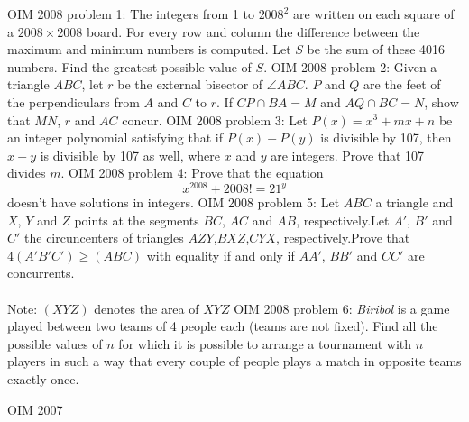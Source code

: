 OIM 2008 problem 1:  The integers from 1 to $ 2008^2$ are written on each square of a $ 2008 \times 2008$ board. For every row and column the difference between the maximum and minimum numbers is computed. Let $ S$ be the sum of these 4016 numbers. Find the greatest possible value of $ S$. 
OIM 2008 problem 2:  Given a triangle $ ABC$, let $ r$ be the external bisector of $ \angle ABC$. $ P$ and $ Q$ are the feet of the perpendiculars from $ A$ and $ C$ to $ r$. If $ CP \cap BA = M$ and $ AQ \cap BC=N$, show that $ MN$, $ r$ and $ AC$ concur. 
OIM 2008 problem 3:  Let $ P(x) = x^3 + mx + n$ be an integer polynomial satisfying that if $ P(x) - P(y)$ is divisible by 107, then $ x - y$ is divisible by 107 as well, where $ x$ and $ y$ are integers. Prove that 107 divides $ m$. 
OIM 2008 problem 4:  Prove that the equation
\[ x^{2008}+ 2008!= 21^y \]
doesn't have solutions in integers. 
OIM 2008 problem 5:  Let $ ABC$ a triangle and $ X$, $ Y$ and $ Z$ points at the segments $ BC$, $ AC$ and $ AB$, respectively.Let $ A'$, $ B'$ and $ C'$ the circuncenters of triangles $ AZY$,$ BXZ$,$ CYX$, respectively.Prove that $ 4(A'B'C')\geq(ABC)$ with equality if and only if $ AA'$, $ BB'$ and $ CC'$ are concurrents. \\\\
Note: $ (XYZ)$ denotes the area of $ XYZ$ 
OIM 2008 problem 6:  \textit{Biribol} is a game played between two teams of 4 people each (teams are not fixed). Find all the possible values of $ n$ for which it is possible to arrange a tournament with $ n$ players in such a way that every couple of people plays a match in opposite teams exactly once. 

OIM 2007 

